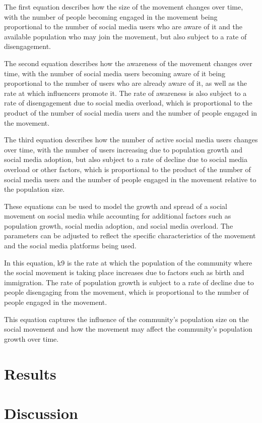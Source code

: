 \documentclass{article}
\begin{document}
        The first equation describes how the size of the movement changes over time, with the number of people becoming engaged in the movement being proportional to the number of social media users who are aware of it and the available population who may join the movement, but also subject to a rate of disengagement.
        
        The second equation describes how the awareness of the movement changes over time, with the number of social media users becoming aware of it being proportional to the number of users who are already aware of it, as well as the rate at which influencers promote it. The rate of awareness is also subject to a rate of disengagement due to social media overload, which is proportional to the product of the number of social media users and the number of people engaged in the movement.
        
        The third equation describes how the number of active social media users changes over time, with the number of users increasing due to population growth and social media adoption, but also subject to a rate of decline due to social media overload or other factors, which is proportional to the product of the number of social media users and the number of people engaged in the movement relative to the population size.
        
        These equations can be used to model the growth and spread of a social movement on social media while accounting for additional factors such as population growth, social media adoption, and social media overload. The parameters can be adjusted to reflect the specific characteristics of the movement and the social media platforms being used.

        In this equation, k9 is the rate at which the population of the community where the social movement is taking place increases due to factors such as birth and immigration. The rate of population growth is subject to a rate of decline due to people disengaging from the movement, which is proportional to the number of people engaged in the movement.

        This equation captures the influence of the community's population size on the social movement and how the movement may affect the community's population growth over time.
    \section{Results}
    \section{Discussion}
    \newpage
    
    
    
\end{document}
